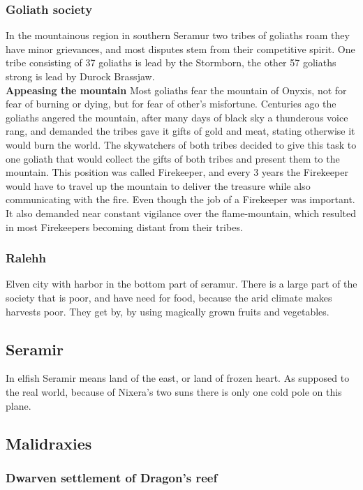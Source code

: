 \documentclass[a4paper]{article}
\begin{document}
\subsubsection{Goliath society}
In the mountainous region in southern Seramur two tribes of goliaths roam they have minor grievances, and most disputes stem from their competitive spirit. One tribe consisting of 37 goliaths is lead by the Stormborn, the other 57 goliaths strong is lead by Durock Brassjaw.
\\
\textbf{Appeasing the mountain}
Most goliaths fear the mountain of Onyxis, not for fear of burning or dying, but for fear of other's misfortune. Centuries ago the goliaths angered the mountain, after many days of black sky a thunderous voice rang, and demanded the tribes gave it gifts of gold and meat, stating otherwise it would burn the world. The skywatchers of both tribes decided to give this task to one goliath that would collect the gifts of both tribes and present them to the mountain. This position was called Firekeeper, and every 3 years the Firekeeper would have to travel up the mountain to deliver the treasure while also communicating with the fire. Even though the job of a Firekeeper was important. It also demanded near constant vigilance over the flame-mountain, which resulted in most Firekeepers becoming distant from their tribes. 


\subsubsection{Ralehh}
Elven city with harbor in the bottom part of seramur. There is a large part of the society that is poor, and have need for food, because the arid climate makes harvests poor. They get by, by using magically grown fruits and vegetables.

\subsection{Seramir}
In elfish Seramir means land of the east, or land of frozen heart. As supposed to the real world, because of Nixera's two suns there is only one cold pole on this plane.

\subsection{Malidraxies}

\subsubsection{Dwarven settlement of Dragon's reef}
\end{document}
